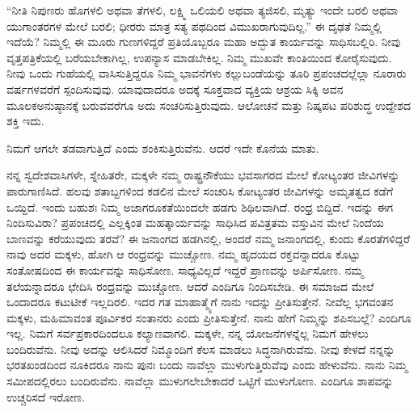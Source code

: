 \vskip   4pt

“ನೀತಿ ನಿಪುಣರು ಹೊಗಳಲಿ ಅಥವಾ ತೆಗಳಲಿ, ಲಕ್ಷ್ಮಿ ಒಲಿಯಲಿ ಅಥವಾ ತ್ಯಜಿಸಲಿ, ಮೃತ್ಯು ಇಂದೇ ಬರಲಿ ಅಥವಾ ಯುಗಾಂತರಗಳ ಮೇಲೆ ಬರಲಿ; ಧೀರರು ಮಾತ್ರ ಸತ್ಯ ಪಥದಿಂದ ವಿಮುಖರಾಗುವುದಿಲ್ಲ.” ಈ ದೃಢತೆ ನಿಮ್ಮಲ್ಲಿ ಇದೆಯೆ? ನಿಮ್ಮಲ್ಲಿ ಈ ಮೂರು ಗುಣಗಳಿದ್ದರೆ ಪ್ರತಿಯೊಬ್ಬರೂ ಮಹಾ ಅದ್ಭುತ ಕಾರ್ಯವನ್ನು ಸಾಧಿಸಬಲ್ಲಿರಿ. ನೀವು ವೃತ್ತಪತ್ರಿಕೆಯಲ್ಲಿ ಬರೆಯಬೇಕಾಗಿಲ್ಲ, ಉಪನ್ಯಾಸ ಮಾಡಬೇಕಿಲ್ಲ. ನಿಮ್ಮ ಮುಖವೇ ಕಾಂತಿಯಿಂದ ಕೋರೈಸುವುದು. ನೀವು ಒಂದು ಗುಹೆಯಲ್ಲಿ ವಾಸಿಸುತ್ತಿದ್ದರೂ ನಿಮ್ಮ ಭಾವನೆಗಳು ಕಲ್ಲುಬಂಡೆಯನ್ನು ತೂರಿ ಪ್ರಪಂಚದಲ್ಲೆಲ್ಲಾ ನೂರಾರು ವರ್ಷಗಳವರೆಗೆ ಸ್ಪಂದಿಸುವುವು. ಯಾವುದಾದರೂ ಅದಕ್ಕೆ ಸೂಕ್ತವಾದ ವ್ಯಕ್ತಿಯ ಆಶ್ರಯ ಸಿಕ್ಕಿ ಅವನ ಮೂಲಕ\break ಅನುಷ್ಠಾನಕ್ಕೆ ಬರುವವರೆಗೂ ಅದು ಸಂಚರಿಸುತ್ತಿರುವುದು. ಆಲೋಚನೆ ಮತ್ತು ನಿಷ್ಕಪಟ ಪರಿಶುದ್ಧ ಉದ್ದೇಶದ ಶಕ್ತಿ ಇದು.

\vskip   4pt

ನಿಮಗೆ ಆಗಲೇ ತಡವಾಗುತ್ತಿದೆ ಎಂದು ಶಂಕಿಸುತ್ತಿರುವೆನು. ಆದರೆ ಇದೇ ಕೊನೆಯ ಮಾತು.

ನನ್ನ ಸ್ವದೇಶವಾಸಿಗಳೇ, ಸ್ನೇಹಿತರೇ, ಮಕ್ಕಳೇ ನಮ್ಮ ರಾಷ್ಟ್ರನೌಕೆಯು ಭವಸಾಗರದ ಮೇಲೆ ಕೋಟ್ಯಂತರ ಜೀವಿಗಳನ್ನು ಪಾರುಗಾಣಿಸಿದೆ. ಹಲವು ಶತಾಬ್ದಗಳಿಂದ ಕಡಲಿನ ಮೇಲೆ ಸಂಚರಿಸಿ ಕೋಟ್ಯಂತರ ಜೀವಿಗಳನ್ನು ಅಮೃತತ್ವದ ಕಡೆಗೆ ಒಯ್ದಿದೆ. ಇಂದು ಬಹುಶಃ ನಿಮ್ಮ ಅಜಾಗರೂಕತೆಯಿಂದಲೇ ಹಡಗು ಶಿಥಿಲವಾಗಿದೆ. ರಂಧ್ರ ಬಿದ್ದಿದೆ. ಇದನ್ನು ಈಗ ನಿಂದಿಸುವಿರಾ? ಪ್ರಪಂಚದಲ್ಲಿ ಎಲ್ಲಕ್ಕಿಂತ ಮಹತ್ಕಾರ್ಯವನ್ನು ಸಾಧಿಸಿದ ಪವಿತ್ರತಮ ವಸ್ತುವಿನ ಮೇಲೆ ನಿಂದೆಯ ಬಾಣವನ್ನು ಕರೆಯುವುದು ತರವೆ? ಈ ಜನಾಂಗದ ಹಡಗಿನಲ್ಲಿ, ಅಂದರೆ ನಮ್ಮ ಜನಾಂಗದಲ್ಲಿ, ಕುಂದು ಕೊರತೆಗಳಿದ್ದರೆ ನಾವು ಅದರ ಮಕ್ಕಳು, ಹೋಗಿ ಆ ರಂಧ್ರವನ್ನು ಮುಚ್ಚೋಣ. ನಮ್ಮ ಹೃದಯದ ರಕ್ತವನ್ನಾದರೂ ಕೊಟ್ಟು ಸಂತೋಷದಿಂದ ಈ ಕಾರ್ಯವನ್ನು ಸಾಧಿಸೋಣ. ಸಾಧ್ಯವಿಲ್ಲದೆ ಇದ್ದರೆ ಪ್ರಾಣವನ್ನು ಅರ್ಪಿಸೋಣ. ನಮ್ಮ ತಲೆಯನ್ನಾದರೂ ಛೇದಿಸಿ ರಂಧ್ರವನ್ನು ಮುಚ್ಚೋಣ. ಆದರೆ ಎಂದಿಗೂ ನಿಂದಿಸಬೇಡಿ. ಈ ಸಮಾಜದ ಮೇಲೆ ಒಂದಾದರೂ ಕಟುಟೀಕೆ ಇಲ್ಲದಿರಲಿ. ಇದರ ಗತ ಮಾಹಾತ್ಮ್ಯೆಗೆ ನಾನು ಇದನ್ನು ಪ್ರೀತಿಸುತ್ತೇನೆ. ನೀವೆಲ್ಲ ಭಗವಂತನ ಮಕ್ಕಳು, ಮಹಿಮಾವಂತ ಪೂರ್ವಿಕರ ಸಂತಾನರು ಎಂದು ಪ್ರೀತಿಸುತ್ತೇನೆ. ನಾನು ಹೇಗೆ ನಿಮ್ಮನ್ನು ಶಪಿಸಬಲ್ಲೆ? ಎಂದಿಗೂ ಇಲ್ಲ. ನಿಮಗೆ ಸರ್ವಪ್ರಕಾರದಿಂದಲೂ ಕಲ್ಯಾಣವಾಗಲಿ. ಮಕ್ಕಳೇ, ನನ್ನ ಯೋಜನೆಗಳನ್ನೆಲ್ಲ ನಿಮಗೆ ಹೇಳಲು ಬಂದಿರುವೆನು. ನೀವು ಅದನ್ನು ಆಲಿಸಿದರೆ ನಿಮ್ಮೊಂದಿಗೆ ಕೆಲಸ ಮಾಡಲು ಸಿದ್ಧನಾಗಿರುವೆನು. ನೀವು ಕೇಳದೆ ನನ್ನನ್ನು ಭರತಖಂಡದಿಂದ ನೂಕಿದರೂ ನಾನು ಪುನಃ ಬಂದು ನಾವೆಲ್ಲಾ ಮುಳುಗುತ್ತಿರುವೆವು ಎಂದು ಹೇಳುವೆನು. ನಾನು ನಿಮ್ಮ ಸಮೀಪದಲ್ಲಿರಲು ಬಂದಿರುವೆನು. ನಾವೆಲ್ಲಾ ಮುಳುಗಲೇಬೇಕಾದರೆ ಒಟ್ಟಿಗೆ ಮುಳುಗೋಣ. ಎಂದಿಗೂ ಶಾಪವನ್ನು ಉಚ್ಚರಿಸದೆ ಇರೋಣ.

